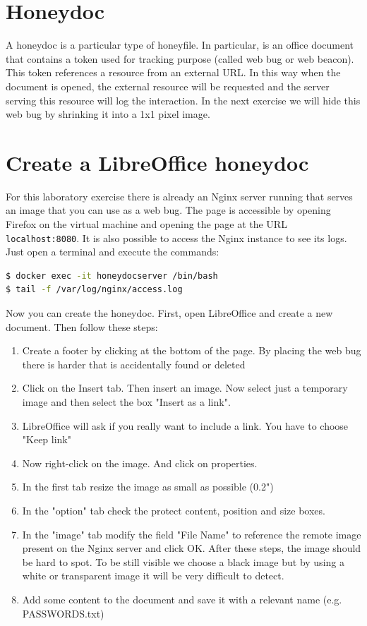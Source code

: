 \documentclass[epsfig,a4paper,11pt,titlepage,oneside,openany]{book}
\begin{document}
\section{Honeydoc}
A honeydoc is a  particular type of honeyfile. In particular, is an office document that contains a token used for tracking purpose (called web bug or web beacon). This token  references a resource from an external URL. In this way when the document is opened, the external resource will be requested and the server serving this resource will log the interaction. In the next exercise we will hide this web bug by shrinking it into a 1x1  pixel image.

\section{Create a LibreOffice honeydoc}

For this laboratory exercise there is already an Nginx server running that serves an image that you can use as a web bug. The page is accessible by opening Firefox on the virtual machine and opening the page at the URL \texttt{localhost:8080}.
It is also possible to access the Nginx instance to see its logs. Just open a terminal and execute the commands:
\begin{lstlisting}[language=bash]
$ docker exec -it honeydocserver /bin/bash
$ tail -f /var/log/nginx/access.log 
\end{lstlisting}

Now you can create the honeydoc. First, open LibreOffice and create a new document. Then follow these steps:
\begin{enumerate}
\itemsep0em
\item Create a footer by clicking at the bottom of the page. By placing the web bug there is harder that is accidentally found or  deleted
\item Click on the Insert tab. Then insert an image. Now select just a temporary image  and then select the box "Insert as a link".
\item LibreOffice will ask if you really want to include a link. You have to choose "Keep link"
\item Now right-click on the image. And click on properties.
\item In the first tab resize the image as small as possible (0.2")
\item In the "option" tab check the protect content, position and size boxes.
\item In the "image" tab modify the field "File Name" to reference the remote image present on the Nginx server and click OK. After these steps, the image should be hard to spot. To be still visible we choose a black image but by using a white or transparent image it will be very difficult to detect.
\item Add some content to the document and save it with a relevant name (e.g. PASSWORDS.txt) 
\end{enumerate}
\end{document}
